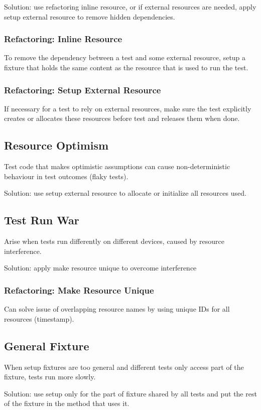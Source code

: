 \documentclass[11pt]{article}
\begin{document}
Solution: use refactoring inline resource, or if
external resources are needed, apply setup external
resource to remove hidden dependencies.
\subsubsection{Refactoring: Inline Resource}
\label{sec:orgc0ac75f}
To remove the dependency between a test and some
external resource, setup a fixture that holds
the same content as the resource that is used to run
the test.
\subsubsection{Refactoring: Setup External Resource}
\label{sec:org97624c9}
If necessary for a test to rely on external
resources, make sure the test explicitly creates
or allocates these resources before test and
releases them when done.
\subsection{Resource Optimism}
\label{sec:orgd731989}
Test code that makes optimistic assumptions can cause
non-deterministic behaviour in test outcomes (flaky tests).

Solution: use setup external resource to allocate
or initialize all resources used.
\subsection{Test Run War}
\label{sec:org619d083}
Arise when tests run differently on different devices,
caused by resource interference.

Solution: apply make resource unique to overcome
interference
\subsubsection{Refactoring: Make Resource Unique}
\label{sec:org9ecd8cb}
Can solve issue of overlapping resource names by
using unique IDs for all resources (timestamp).
\subsection{General Fixture}
\label{sec:org9b39b41}
When setup fixtures are too general and different
tests only access part of the fixture, tests run more slowly.

Solution: use setup only for the part of fixture shared
by all tests and put the rest of the fixture in the
method that uses it.
\end{document}
